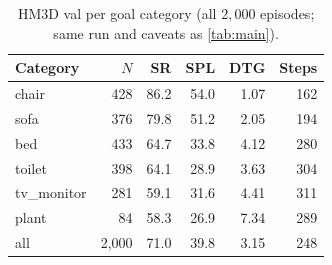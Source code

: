 \documentclass[10pt]{article}
\newcommand{\oldrev}{\textsuperscript{$\ast$}}
\begin{document}
\begin{table}[t]
\centering
\caption{HM3D val per goal category (all $2{,}000$ episodes; same run and
caveats as \cref{tab:main}).}
\label{tab:hm3d-cat}
\small
\begin{tabular}{@{}lrrrrr@{}}
\toprule
Category & $N$ & SR & SPL & DTG & Steps \\
\midrule
chair       & 428 & 86.2 & 54.0 & 1.07 & 162 \\
sofa        & 376 & 79.8 & 51.2 & 2.05 & 194 \\
bed         & 433 & 64.7 & 33.8 & 4.12 & 280 \\
toilet      & 398 & 64.1 & 28.9 & 3.63 & 304 \\
tv\_monitor & 281 & 59.1 & 31.6 & 4.41 & 311 \\
plant       & 84  & 58.3 & 26.9 & 7.34 & 289 \\
\midrule
all         & 2{,}000 & 71.0\rlap{\oldrev} & 39.8\rlap{\oldrev} & 3.15 & 248 \\
\bottomrule
\end{tabular}
\end{table}
\end{document}
